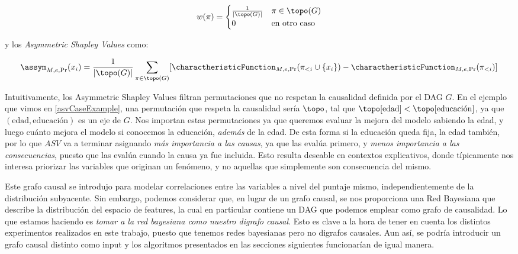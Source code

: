 \[
w(\pi) = \begin{cases}
	\frac{1}{|\topo(G)|}  & \pi \in \topo(G) \\
	0 & \text{en otro caso}
\end{cases}    
\]


y los \textit{Asymmetric Shapley Values} como:

\[
\assym_{M,e,\Pr}(x_i) = \frac{1}{|\topo(G)|} \sum_{\pi \in \topo(G)} [\charactheristicFunction_{M,e,\Pr}(\pi_{<i} \cup \{x_i\}) - \charactheristicFunction_{M,e,\Pr}(\pi_{<i})] 
\]

Intuitivamente, los Asymmetric Shapley Values filtran permutaciones que no respetan la causalidad definida por el DAG $G$. En el ejemplo que vimos en \ref{asvCaseExample}, una permutación que respeta la causalidad sería $\topo$, tal que $\topo[\text{edad}] < \topo[\text{educación}]$, ya que $(\text{edad}, \text{educación})$ es un eje de $G$. Nos importan estas permutaciones ya que queremos evaluar la mejora del modelo sabiendo la edad, y luego cuánto mejora el modelo si conocemos la educación, \emph{además} de la edad. De esta forma si la educación queda fija, la edad también, por lo que $ASV$ va a terminar asignando \emph{más importancia a las causas}, ya que las evalúa primero, y \emph{menos importancia a las consecuencias}, puesto que las evalúa cuando la causa ya fue incluida. Esto resulta deseable en contextos explicativos, donde típicamente nos interesa priorizar las variables que originan un fenómeno, y no aquellas que simplemente son consecuencia del mismo.


Este grafo causal se introdujo para modelar correlaciones entre las variables a nivel del puntaje mismo, independientemente de la distribución subyacente. Sin embargo, podemos considerar que, en lugar de un grafo causal, se nos proporciona una Red Bayesiana que describe la distribución del espacio de features, la cual en particular contiene un DAG que podemos emplear como grafo de causalidad. Lo que estamos haciendo es \emph{tomar a la red bayesiana como nuestro digrafo causal}.
Esto es clave a la hora de tener en cuenta los distintos experimentos realizados en este trabajo, puesto que tenemos redes bayesianas pero no digrafos causales. Aun así, se podría introducir un grafo causal distinto como input y los algoritmos presentados en las secciones siguientes funcionarían de igual manera. 

